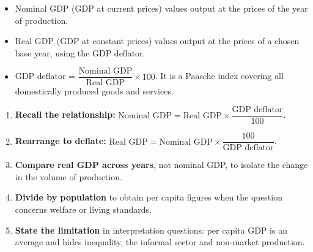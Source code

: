 \documentclass[11pt]{article}
\newcommand{\cle}[1]{{\popxbold\color{popdark}#1}}
\begin{document}
\begin{definition}
\begin{itemize}
\item \cle{Nominal GDP} (GDP at current prices) values output at the prices of the year of production.
\item \cle{Real GDP} (GDP at constant prices) values output at the prices of a chosen base year, using the GDP deflator.
\item \cle{GDP deflator} = $\dfrac{\text{Nominal GDP}}{\text{Real GDP}} \times 100$. It is a Paasche index covering all domestically produced goods and services.
\end{itemize}
\end{definition}

\begin{methode}
\begin{enumerate}
\item \textbf{Recall the relationship:} $\text{Nominal GDP} = \text{Real GDP} \times \dfrac{\text{GDP deflator}}{100}$.
\item \textbf{Rearrange to deflate:} $\text{Real GDP} = \text{Nominal GDP} \times \dfrac{100}{\text{GDP deflator}}$.
\item \textbf{Compare real GDP across years}, not nominal GDP, to isolate the change in the volume of production.
\item \textbf{Divide by population} to obtain per capita figures when the question concerns welfare or living standards.
\item \textbf{State the limitation} in interpretation questions: per capita GDP is an average and hides inequality, the informal sector and non-market production.
\end{enumerate}
\end{methode}
\end{document}
